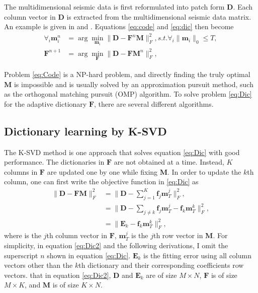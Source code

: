 The multidimensional seismic data is first reformulated into patch form $\mathbf{D}$. Each column vector in $\mathbf{D}$ is extracted from the multidimensional seismic data matrix. An example is given in \cite{siwei2015} and \cite{yangkang2016dsd}.
Equations \ref{eq:code} and \ref{eq:dic} then become 
\begin{align}
\label{eq:Code}
\forall_i \mathbf{m}_i ^n &= \arg \min_{\mathbf{m}_i} \parallel \mathbf{D} - \mathbf{F}^n\mathbf{M} \parallel_F^2, s.t. \forall_i \parallel \mathbf{m}_i \parallel_0 \le T, \\
\label{eq:Dic}
\mathbf{F}^{n+1} &= \arg\min_{\mathbf{F}} \parallel \mathbf{D} - \mathbf{FM}^n \parallel_F^2,
\end{align}

Problem \ref{eq:Code} is a NP-hard problem, and directly finding the truly optimal $\mathbf{M}$ is impossible and is usually solved by an approximation pursuit method, such as the orthogonal matching pursuit (OMP) algorithm. To solve problem \ref{eq:Dic} for the adaptive dictionary $\mathbf{F}$, there are several different algorithms.

\subsection{Dictionary learning by K-SVD}
The K-SVD method \cite[]{aharon2006} is one approach that solves equation \ref{eq:Dic} with good performance. The dictionaries in $\mathbf{F}$ are not obtained at a time. Instead, $K$ columns in $\mathbf{F}$ are updated one by one while fixing $\mathbf{M}$. In order to update the $k$th column, one can first write the objective function in  \ref{eq:Dic} as
\begin{equation}
\label{eq:Dic2}
\begin{split}
\parallel \mathbf{D} - \mathbf{FM} \parallel_F^2  & = \parallel \mathbf{D} - \sum_{j=1}^{K}\mathbf{f}_j\mathbf{m}_T^j \parallel_F^2, \\
&= \parallel \mathbf{D} - \sum_{j\ne k}\mathbf{f}_j\mathbf{m}_T^j - \mathbf{f}_k\mathbf{m}_T^k \parallel_F^2, \\
& =  \parallel\mathbf{E}_k- \mathbf{f}_k\mathbf{m}_T^k \parallel_F^2 ,
\end{split}
\end{equation}
where  is the $j$th column vector in $\mathbf{F}$, $\mathbf{m}_T^j$ is the $j$th row vector in $\mathbf{M}$.  For simplicity, in equation \ref{eq:Dic2} and the following derivations, I omit the superscript $n$ shown in equation \ref{eq:Dic}. $\mathbf{E}_k$ is the fitting error using all column vectors other than the $k$th dictionary and their corresponding coefficients row vectors.   
 that in equation \ref{eq:Dic2}, $\mathbf{D}$ and $\mathbf{E}_k$ are of size $M\times N$, $\mathbf{F}$ is of size $M\times K$, and $\mathbf{M}$ is of size $K\times N$. 


